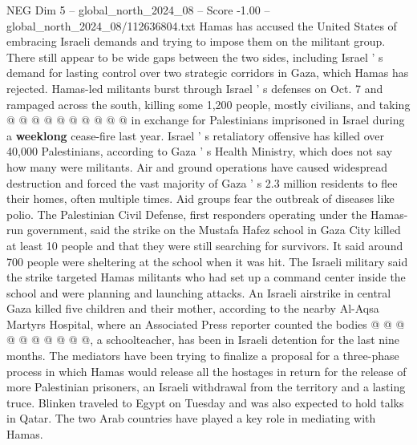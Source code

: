 \begin{textsample}{NEG Dim 5 – global\_north\_2024\_08 – Score -1.00 – global\_north\_2024\_08/112636804.txt}
Hamas has accused the United States of embracing Israeli demands and trying to impose them on the militant group.
There still appear to be wide gaps between the two sides, including Israel ' s demand for lasting control over two strategic corridors in Gaza, which Hamas has rejected.
Hamas-led militants burst through Israel ' s defenses on Oct. 7 and rampaged across the south, killing some 1,200 people, mostly civilians, and taking @ @ @ @ @ @ @ @ @ @ in exchange for Palestinians imprisoned in Israel during a \textbf{weeklong} cease-fire last year.
Israel ' s retaliatory offensive has killed over 40,000 Palestinians, according to Gaza ' s Health Ministry, which does not say how many were militants.
Air and ground operations have caused widespread destruction and forced the vast majority of Gaza ' s 2.3 million residents to flee their homes, often multiple times.
Aid groups fear the outbreak of diseases like polio.
The Palestinian Civil Defense, first responders operating under the Hamas-run government, said the strike on the Mustafa Hafez school in Gaza City killed at least 10 people and that they were still searching for survivors.
It said around 700 people were sheltering at the school when it was hit.
The Israeli military said the strike targeted Hamas militants who had set up a command center inside the school and were planning and launching attacks.
An Israeli airstrike in central Gaza killed five children and their mother, according to the nearby Al-Aqsa Martyrs Hospital, where an Associated Press reporter counted the bodies @ @ @ @ @ @ @ @ @ @, a schoolteacher, has been in Israeli detention for the last nine months.
The mediators have been trying to finalize a proposal for a three-phase process in which Hamas would release all the hostages in return for the release of more Palestinian prisoners, an Israeli withdrawal from the territory and a lasting truce.
Blinken traveled to Egypt on Tuesday and was also expected to hold talks in Qatar.
The two Arab countries have played a key role in mediating with Hamas.

\end{textsample}
